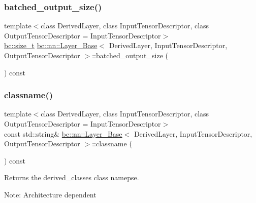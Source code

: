 \subsubsection{\texorpdfstring{batched\+\_\+output\+\_\+size()}{batched\_output\_size()}}
{\footnotesize\ttfamily template$<$class Derived\+Layer, class Input\+Tensor\+Descriptor, class Output\+Tensor\+Descriptor = Input\+Tensor\+Descriptor$>$ \\
\hyperlink{namespacebc_aaf8e3fbf99b04b1b57c4f80c6f55d3c5}{bc\+::size\+\_\+t} \hyperlink{structbc_1_1nn_1_1Layer__Base}{bc\+::nn\+::\+Layer\+\_\+\+Base}$<$ Derived\+Layer, Input\+Tensor\+Descriptor, Output\+Tensor\+Descriptor $>$\+::batched\+\_\+output\+\_\+size (\begin{DoxyParamCaption}{ }\end{DoxyParamCaption}) const\hspace{0.3cm}{\ttfamily [inline]}}

\mbox{\label{structbc_1_1nn_1_1Layer__Base_a3cae4e4c7061a12bb494886dc809c33b}} 
\subsubsection{\texorpdfstring{classname()}{classname()}}
{\footnotesize\ttfamily template$<$class Derived\+Layer, class Input\+Tensor\+Descriptor, class Output\+Tensor\+Descriptor = Input\+Tensor\+Descriptor$>$ \\
const std\+::string\& \hyperlink{structbc_1_1nn_1_1Layer__Base}{bc\+::nn\+::\+Layer\+\_\+\+Base}$<$ Derived\+Layer, Input\+Tensor\+Descriptor, Output\+Tensor\+Descriptor $>$\+::classname (\begin{DoxyParamCaption}{ }\end{DoxyParamCaption}) const\hspace{0.3cm}{\ttfamily [inline]}}



Returns the derived\+\_\+classes class namepse. 

Note\+: Architecture dependent \mbox{\label{structbc_1_1nn_1_1Layer__Base_a17fbc289c15125d52550d011d076149c}} 
